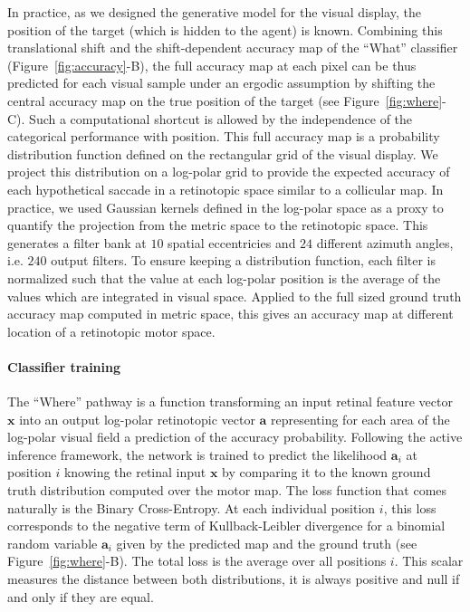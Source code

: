 In practice, as we designed the generative model for the visual display, the position of the target (which is hidden to the agent) is known. Combining this translational shift and the shift-dependent accuracy map of the ``What'' classifier (Figure~\ref{fig:accuracy}-B), the full accuracy map at each pixel can be thus predicted for each visual sample under an ergodic assumption by shifting the central accuracy map on the true position of the target (see Figure~\ref{fig:where}-C). Such a computational shortcut is allowed by the independence of the categorical performance with position. This full accuracy map is a probability distribution function defined on the rectangular grid of the visual display. We project this distribution on a log-polar grid to provide the expected accuracy of each hypothetical saccade in a retinotopic space similar to a collicular map. In practice, we used Gaussian kernels defined in the log-polar space as a proxy to quantify the projection from the metric space to the retinotopic space. This generates a filter bank at $10$ spatial eccentricies and $24$ different azimuth angles, i.e. $240$ output filters. To ensure keeping a distribution function, each filter is normalized such that the value at each log-polar position is the average of the values which are integrated in visual space. Applied to the full sized ground truth accuracy map computed in metric space, this gives an accuracy map at different location of a retinotopic motor space. %
%
\paragraph{Classifier training}
The ``Where'' pathway is a function transforming an input retinal feature vector $\boldsymbol{x}$ into an output log-polar retinotopic vector $\boldsymbol{a}$ representing for each area of the log-polar visual field a prediction of the accuracy probability. Following the active inference framework, the network is trained to predict the likelihood $\boldsymbol{a}_i$ at position $i$ knowing the retinal input $\boldsymbol{x}$ by comparing it to the known ground truth distribution computed over the motor map. The loss function that comes naturally is the Binary Cross-Entropy. At each individual position $i$, this loss corresponds to the negative term of Kullback-Leibler divergence for a binomial random variable $\boldsymbol{a}_i$ given by the predicted map and the ground truth (see Figure~\ref{fig:where}-B).  The total loss is the average over all positions $i$. This scalar measures the distance between both distributions, it is always positive and null if and only if they are equal.

